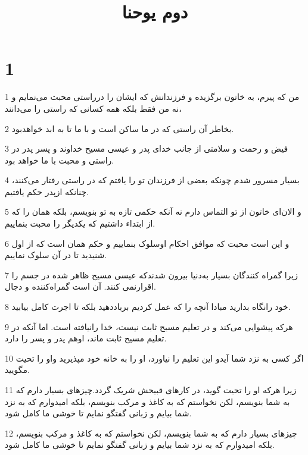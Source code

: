 

\title{دوم يوحنا}


\chapter{1}

\par 1 من که پیرم، به خاتون برگزیده و فرزندانش که ایشان را درراستی محبت می‌نمایم و نه من فقط بلکه همه کسانی که راستی را می‌دانند،
\par 2 بخاطر آن راستی که در ما ساکن است و با ما تا به ابد خواهدبود.
\par 3 فیض و رحمت و سلامتی از جانب خدای پدر و عیسی مسیح خداوند و پسر پدر در راستی و محبت با ما خواهد بود.
\par 4 بسیار مسرور شدم چونکه بعضی از فرزندان تو را یافتم که در راستی رفتار می‌کنند، چنانکه ازپدر حکم یافتیم.
\par 5 و الان‌ای خاتون از تو التماس دارم نه آنکه حکمی تازه به تو بنویسم، بلکه همان را که از ابتداء داشتیم که یکدیگر را محبت بنماییم.
\par 6 و این است محبت که موافق احکام اوسلوک بنماییم و حکم همان است که از اول شنیدید تا در آن سلوک نماییم.
\par 7 زیرا گمراه کنندگان بسیار به‌دنیا بیرون شدندکه عیسی مسیح ظاهر شده در جسم را اقرارنمی کنند. آن است گمراه‌کننده و دجال.
\par 8 خود رانگاه بدارید مبادا آنچه را که عمل کردیم برباددهید بلکه تا اجرت کامل بیابید.
\par 9 هرکه پیشوایی می‌کند و در تعلیم مسیح ثابت نیست، خدا رانیافته است. اما آنکه در تعلیم مسیح ثابت ماند، اوهم پدر و پسر را دارد.
\par 10 اگر کسی به نزد شما آیدو این تعلیم را نیاورد، او را به خانه خود مپذیرید واو را تحیت مگویید.
\par 11 زیرا هرکه او را تحیت گوید، در کارهای قبیحش شریک گردد.چیزهای بسیار دارم که به شما بنویسم، لکن نخواستم که به کاغذ و مرکب بنویسم، بلکه امیدوارم که به نزد شما بیایم و زبانی گفتگو نمایم تا خوشی ما کامل شود.
\par 12 چیزهای بسیار دارم که به شما بنویسم، لکن نخواستم که به کاغذ و مرکب بنویسم، بلکه امیدوارم که به نزد شما بیایم و زبانی گفتگو نمایم تا خوشی ما کامل شود.


